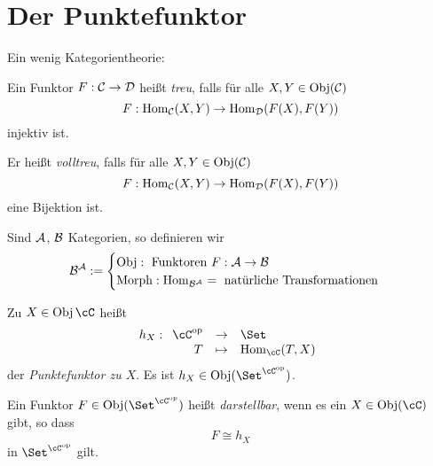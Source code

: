 \section{Der Punktefunktor} %

Ein wenig Kategorientheorie:
\begin{definition}
    \label{def:treu}
    Ein Funktor $F:\cal C \to \cal D$ heißt
    \emph{treu}, falls für alle $X,Y \in \Obj(\cal C)$
    \[F : \Hom_{\cal C}(X,Y) \to \Hom_{\cal D}(F(X),F(Y))\]
    injektiv ist.
    
    Er heißt \emph{volltreu}, falls für alle $X,Y \in \Obj(\cal C)$
    \[F :\Hom_{\cal C}(X,Y) \to \Hom_{\cal D}(F(X),F(Y))\]
    eine Bijektion ist.
\end{definition}


\begin{notation}
    Sind $\cal A$, $\cal B$ Kategorien, so definieren wir
    \[\cal B^{\cal A} := 
        \begin{cases}
            \Obj: \text{ Funktoren }F:\cal A \to \cal B\\
            \Morph: \Hom_{\cal B^{\cal A}} = 
                \text{ natürliche Transformationen}
        \end{cases}\]
\end{notation}


\begin{definition}
    \label{def:punktefunktor}
    Zu $X \in \Obj \cC$ heißt
    \[h_X: \funcdef{ \cC\op &\to& \Set \\
        T & \mapsto & \Hom_\cC(T,X)}\]
    der \emph{Punktefunktor zu $X$}.
    Es ist $h_X \in \Obj(\Set^{\cC\op})$.
    
    Ein Funktor $F \in \Obj(\Set^{\cC\op})$ heißt \emph{darstellbar}, 
    wenn es ein $X \in \Obj(\cC)$ gibt, so dass
    \[F \cong h_X\]
    in $\Set^{\cC\op}$ gilt.
\end{definition}


